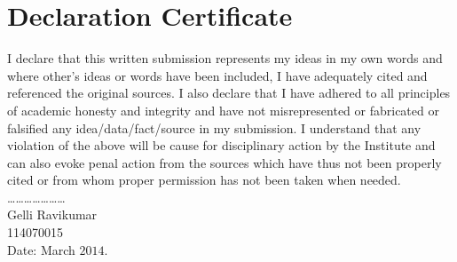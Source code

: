 \makeapproval


\chapter*{Declaration Certificate}

\noindent I declare that this written submission represents my ideas in my own words and where other's ideas or words have been included, I have adequately cited and referenced the original sources. I also declare that I have adhered to all principles of academic honesty and integrity and have not misrepresented or fabricated or falsified any idea/data/fact/source in my submission. I understand that any violation of the above will be cause for disciplinary action by the Institute and can also evoke penal action from the sources which have thus not been properly cited or from whom proper permission has not been taken when needed.\\

\hspace*{4.1 in}\ldots \ldots \ldots \ldots\ldots \ldots \ldots \vspace{0.1in}\\
\hspace*{4.2 in} Gelli Ravikumar\\
\hspace*{4.2 in} 114070015\\
Date: March $2014$.


\begin{coursecertificate}

\end{coursecertificate}


